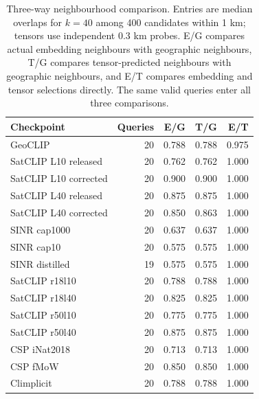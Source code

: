 \begin{table}[htbp]\centering\small
\caption{Three-way neighbourhood comparison. Entries are median overlaps for $k=40$ among 400 candidates within 1 km; tensors use independent 0.3 km probes. E/G compares actual embedding neighbours with geographic neighbours, T/G compares tensor-predicted neighbours with geographic neighbours, and E/T compares embedding and tensor selections directly. The same valid queries enter all three comparisons.}
\label{tab:neighbourhoods}
\begin{tabular}{@{}lrrrr@{}}\toprule
Checkpoint&Queries&E/G&T/G&E/T\\\midrule
GeoCLIP&20&0.788&0.788&0.975\\
SatCLIP L10 released&20&0.762&0.762&1.000\\
SatCLIP L10 corrected&20&0.900&0.900&1.000\\
SatCLIP L40 released&20&0.875&0.875&1.000\\
SatCLIP L40 corrected&20&0.850&0.863&1.000\\
SINR cap1000&20&0.637&0.637&1.000\\
SINR cap10&20&0.575&0.575&1.000\\
SINR distilled&19&0.575&0.575&1.000\\
SatCLIP r18l10&20&0.788&0.788&1.000\\
SatCLIP r18l40&20&0.825&0.825&1.000\\
SatCLIP r50l10&20&0.775&0.775&1.000\\
SatCLIP r50l40&20&0.875&0.875&1.000\\
CSP iNat2018&20&0.713&0.713&1.000\\
CSP fMoW&20&0.850&0.850&1.000\\
Climplicit&20&0.788&0.788&1.000\\
\bottomrule\end{tabular}
\end{table}
